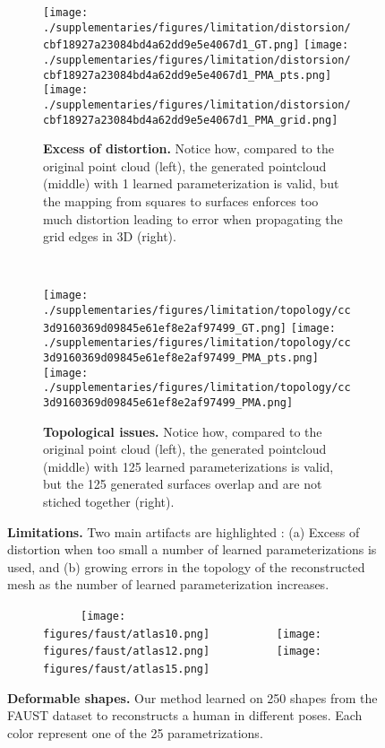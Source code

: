 \documentclass[10pt,twocolumn,letterpaper]{article}
\begin{document}
\newpage
\begin{figure*}[t!]
\centering
\begin{subfigure}[b]{0.98\linewidth}
\centering
 \texttt{[image: ./supplementaries/figures/limitation/distorsion/cbf18927a23084bd4a62dd9e5e4067d1\_GT.png]}
 \texttt{[image: ./supplementaries/figures/limitation/distorsion/cbf18927a23084bd4a62dd9e5e4067d1\_PMA\_pts.png]}
 \texttt{[image: ./supplementaries/figures/limitation/distorsion/cbf18927a23084bd4a62dd9e5e4067d1\_PMA\_grid.png]}
\caption{ {\bf Excess of distortion. } Notice how, compared to the original point cloud (left), the generated pointcloud (middle) with 1 learned parameterization is valid, but the mapping from squares to surfaces enforces too much distortion leading to error when propagating the grid edges in 3D (right).}
\end{subfigure}
\\
\begin{subfigure}[b]{0.98\linewidth}
\centering
 \texttt{[image: ./supplementaries/figures/limitation/topology/cc3d9160369d09845e61ef8e2af97499\_GT.png]}
 \texttt{[image: ./supplementaries/figures/limitation/topology/cc3d9160369d09845e61ef8e2af97499\_PMA\_pts.png]}
 \texttt{[image: ./supplementaries/figures/limitation/topology/cc3d9160369d09845e61ef8e2af97499\_PMA.png]}
\caption{{\bf Topological issues. } Notice how, compared to the original point cloud (left), the generated pointcloud (middle) with 125 learned parameterizations is valid, but the 125 generated surfaces overlap and are not stiched together (right).}
\end{subfigure}
\caption{
{\bf Limitations.} Two main artifacts are highlighted : (a) Excess of distortion when too small a number of learned parameterizations is used, and (b) growing errors in the topology of the reconstructed mesh as the number of learned parameterization increases.}
  \label{fig:limitation}
\end{figure*}


\begin{figure*}[t!]

\centering

\begin{subfigure}[b]{\linewidth}
 ~~~~~~\texttt{[image: figures/faust/atlas10.png]}~~~~~~~~~~
  \texttt{[image: figures/faust/atlas12.png]}~~~~~~~~~~
\texttt{[image: figures/faust/atlas15.png]}~~
\end{subfigure}

\caption{
{\bf Deformable shapes.} Our method learned on 250 shapes from the FAUST dataset to reconstructs a human in different poses. Each color represent one of the 25 parametrizations.}
  \label{fig:faust}
\end{figure*} 
\end{document}
